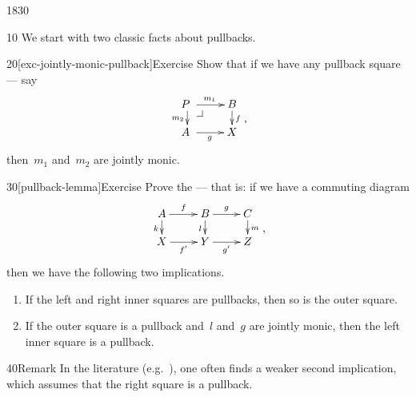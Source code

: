 \begin{parsec}{1830}%
\begin{point}{10}%
    We start with two classic facts about pullbacks.
\end{point}
\begin{point}{20}[exc-jointly-monic-pullback]{Exercise}%
Show that if we have any pullback square --- say
\begin{equation*}
    \vcenter{\vbox{\xymatrix@R-1pc{
        {P\ } \pullback \ar[r]^{m_1} \ar[d]_{m_2}
        & B \ar[d]^f
                \\ {A\ } \ar[r]_{g}
    & X}}} \text{,}
\end{equation*}
then~$m_1$ and~$m_2$ are jointly monic.
\end{point}
\begin{point}{30}[pullback-lemma]{Exercise}%
Prove the  --- that is:
    if we have a commuting diagram
\begin{equation*}
    \vcenter{\vbox{\xymatrix@R-1pc{
                A \ar[r]^f \ar[d]_k
                & B \ar[r]^g \ar[d]_l
                & C \ar[d]^m
                \\ X \ar[r]_{f'}
                & Y \ar[r]_{g'}
                & Z
    }}} \text{,}
\end{equation*}
then we have the following two implications.
\begin{enumerate}
\item
If the left and right inner squares are pullbacks,
    then so is the outer square.
\item
If the outer square is a pullback
    and~$l$ and~$g$ are jointly monic,
    then the left inner square is a pullback.
\end{enumerate}
\spacingfix{}
\begin{point}{40}{Remark}%
In the literature (e.g.~\cite[III.5 exc.~8]{maclane}),
    one often finds a weaker second implication,
    which assumes that the right square is a pullback.
\end{point}
\end{point}
\end{parsec}

